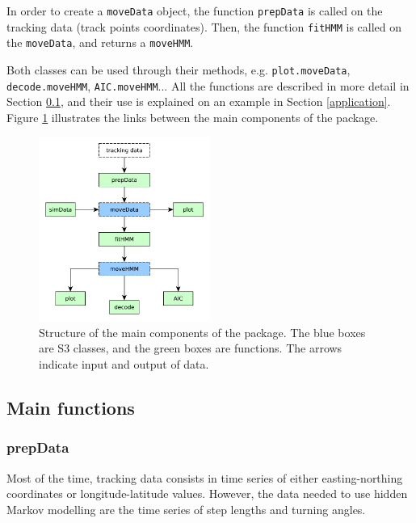 \documentclass[]{article}
\begin{document}
In order to create a \texttt{moveData} object, the function \texttt{prepData} is called on the tracking data (track points coordinates). Then, the function \texttt{fitHMM} is called on the \texttt{moveData}, and returns a \texttt{moveHMM}.

Both classes can be used through their methods, e.g. \texttt{plot.moveData}, \texttt{decode.moveHMM}, \texttt{AIC.moveHMM}... All the functions are described in more detail in Section \ref{main_functions}, and their use is explained on an example in Section \ref{application}.\\

Figure \ref{struct} illustrates the links between the main components of the package.

\begin{figure}[h]
	\centering
	\includegraphics[width=0.5\textwidth]{pictures/struct}
	\caption{Structure of the main components of the package. The blue boxes are S3 classes, and the green boxes are functions. The arrows indicate input and output of data.}
	\label{struct}
\end{figure}


\subsection{Main functions} \label{main_functions}

\subsubsection{prepData}
Most of the time, tracking data consists in time series of either easting-northing coordinates or longitude-latitude values. However, the data needed to use hidden Markov modelling are the time series of step lengths and turning angles.\\
\end{document}
